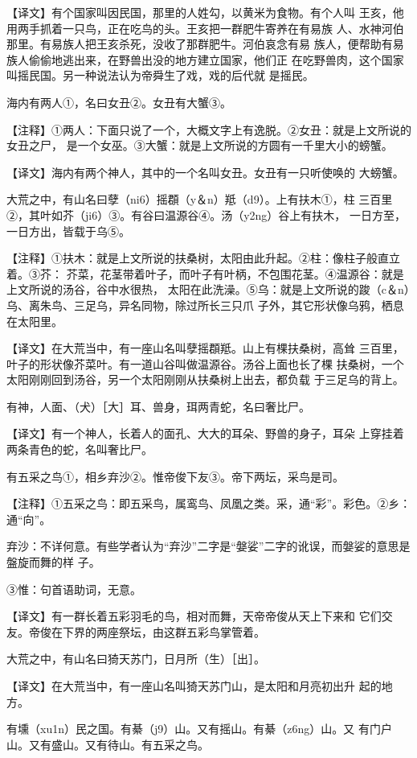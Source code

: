 \documentclass[a4paper,12pt,UTF8,twoside]{ctexbook}
\begin{document}
【译文】有个国家叫因民国，那里的人姓勾，以黄米为食物。有个人叫 王亥，他用两手抓着一只鸟，正在吃鸟的头。王亥把一群肥牛寄养在有易族 人、水神河伯那里。有易族人把王亥杀死，没收了那群肥牛。河伯哀念有易 族人，便帮助有易族人偷偷地逃出来，在野兽出没的地方建立国家，他们正 在吃野兽肉，这个国家叫摇民国。另一种说法认为帝舜生了戏，戏的后代就 是摇民。

海内有两人①，名曰女丑②。女丑有大蟹③。

【注释】①两人：下面只说了一个，大概文字上有逸脱。②女丑：就是上文所说的女丑之尸， 是一个女巫。③大蟹：就是上文所说的方圆有一千里大小的螃蟹。

【译文】海内有两个神人，其中的一个名叫女丑。女丑有一只听使唤的 大螃蟹。

大荒之中，有山名曰孽（ni6）摇頵（y＆n）羝（d9）。上有扶木①，柱 三百里②，其叶如芥（ji6）③。有谷曰温源谷④。汤（y2ng）谷上有扶木， 一日方至，一日方出，皆载于乌⑤。

【注释】①扶木：就是上文所说的扶桑树，太阳由此升起。②柱：像柱子般直立着。③芥： 芥菜，花茎带着叶子，而叶子有叶柄，不包围花茎。④温源谷：就是上文所说的汤谷，谷中水很热， 太阳在此洗澡。⑤乌：就是上文所说的踆（c＆n）乌、离朱鸟、三足乌，异名同物，除过所长三只爪 子外，其它形状像乌鸦，栖息在太阳里。

【译文】在大荒当中，有一座山名叫孽摇頵羝。山上有棵扶桑树，高耸 三百里，叶子的形状像芥菜叶。有一道山谷叫做温源谷。汤谷上面也长了棵 扶桑树，一个太阳刚刚回到汤谷，另一个太阳刚刚从扶桑树上出去，都负载 于三足乌的背上。

有神，人面、（犬）［大］耳、兽身，珥两青蛇，名曰奢比尸。

【译文】有一个神人，长着人的面孔、大大的耳朵、野兽的身子，耳朵 上穿挂着两条青色的蛇，名叫奢比尸。

有五采之鸟①，相乡弃沙②。惟帝俊下友③。帝下两坛，采鸟是司。

【注释】①五采之鸟：即五采鸟，属鸾鸟、凤凰之类。采，通“彩”。彩色。②乡：通“向”。

弃沙：不详何意。有些学者认为“弃沙”二字是“媻娑”二字的讹误，而媻娑的意思是盤旋而舞的样 子。

③惟：句首语助词，无意。

【译文】有一群长着五彩羽毛的鸟，相对而舞，天帝帝俊从天上下来和 它们交友。帝俊在下界的两座祭坛，由这群五彩鸟掌管着。

大荒之中，有山名曰猗天苏门，日月所（生）［出］。

【译文】在大荒当中，有一座山名叫猗天苏门山，是太阳和月亮初出升 起的地方。

有壎（xu1n）民之国。有綦（j9）山。又有摇山。有綦（z6ng）山。又 有门户山。又有盛山。又有待山。有五采之鸟。
\end{document}
